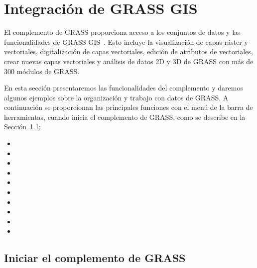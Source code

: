 
\section{Integración de GRASS GIS}\label{sec:grass}


El complemento de GRASS proporciona acceso a los conjuntos de datos y las funcionalidades de GRASS GIS~\cite{GRASSweb}.
Esto incluye la visualización de capas ráster y vectoriales, digitalización de capas vectoriales, edición de atributos
de vectoriales, crear nuevas capas vectoriales y análisis de datos 2D y 3D de GRASS con más de 300 módulos de GRASS.

En esta sección presentaremos las funcionalidades del complemento y daremos algunos ejemplos sobre la organización 
y trabajo con datos de GRASS. A continuación se proporcionan las principales funciones con el menú de la barra de 
herramientas, cuando inicia el complemento de GRASS, como se describe en la Sección~\ref{sec:starting_grass}:
 
\begin{itemize}
\item {}
\item {}
\item {}
\item {}
\item {}
\item {}
\item {}
\item {}
\item {} 
\item {}
\end{itemize}

\subsection{Iniciar el complemento de GRASS}\label{sec:starting_grass}

